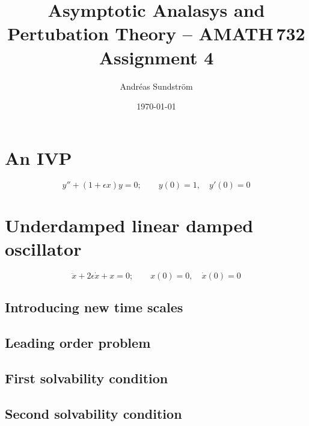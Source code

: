 \documentclass[11pt,letter, swedish, english
]{article}
\begin{document}
\title{Asymptotic Analasys and Pertubation Theory -- AMATH\,732 \\
Assignment 4}
\author{Andréas Sundström}
\date{\today}

\maketitle



\section{An IVP}

\begin{equation}
y''+(1+\epsilon x)y=0;\qquad
y(0)=1,\quad y'(0)=0
\end{equation}

\section{Underdamped linear damped oscillator}

\begin{equation}
\ddot{x}+2\epsilon\dot{x}+x=0;\qquad
x(0)=0,\quad \dot{x}(0)=0
\end{equation}


\subsection{Introducing new time scales}

\subsection{Leading order problem}

\subsection{First solvability condition}

\subsection{Second solvability condition}
\end{document}
